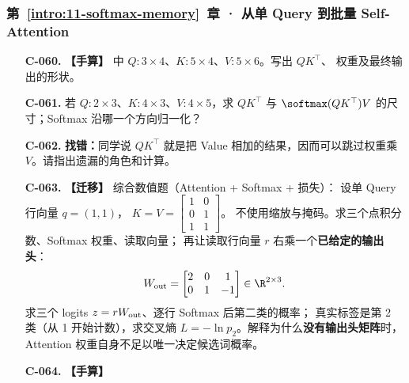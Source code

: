 \subsubsection*{第~\ref*{intro:11-softmax-memory}~章 · 从单 Query 到批量 Self-Attention}
\begin{enumerate}[label={},leftmargin=4.8em,itemsep=4pt]
\item[\textbf{C-060.}] \leavevmode{}\label{exercise:C-060}\label{exercise:attention-shapes}\textbf{【手算】}  中 $Q:3\times4$、$K:5\times4$、$V:5\times6$。写出 $QK^\top$、 权重及最终输出的形状。
\item[\textbf{C-061.}] \leavevmode{}\label{exercise:C-061}\label{exercise:cross-attention-shapes}若 $Q:2\times3$、$K:4\times3$、$V:4\times5$，求 $QK^\top$ 与 $\softmax(QK^\top)V$ 的尺寸；Softmax 沿哪一个方向归一化？
\item[\textbf{C-062.}] \leavevmode{}\label{exercise:C-062}\label{exercise:score-value-confusion}\textbf{找错：}同学说 $QK^\top$ 就是把 Value 相加的结果，因而可以跳过权重乘 $V$。请指出遗漏的角色和计算。
\item[\textbf{C-063.}] \leavevmode{}\label{exercise:C-063}\label{exercise:attention-loss-transfer}\textbf{【迁移】} 综合数值题（Attention + Softmax + 损失）：
设单 Query 行向量 $q=(1,1)$，
$K=V=\begin{bmatrix}1&0\\0&1\\1&1\end{bmatrix}$。
不使用缩放与掩码。求三个点积分数、Softmax 权重、读取向量；
再让读取行向量 $r$ 右乘一个\textbf{已给定的输出头}：
\[
W_{\rm out}=\begin{bmatrix}
2&0&1\\0&1&-1
\end{bmatrix}\in\R^{2\times3}.
\]
求三个 logits $z=rW_{\rm out}$、逐行 Softmax 后第二类的概率；
真实标签是第 2 类（从 1 开始计数），求交叉熵
$L=-\ln p_2$。解释为什么\textbf{没有输出头矩阵}时，
Attention 权重自身不足以唯一决定候选词概率。
\item[\textbf{C-064.}] \leavevmode{}\label{exercise:C-064}\label{exercise:batch-softmax-recompute}\label{exercise:batch-attention-new} \textbf{【手算】}

\end{enumerate}

